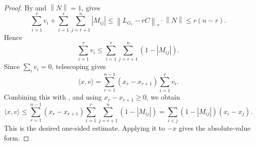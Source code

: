 \documentclass[10pt,reqno]{amsart}
\theoremstyle{definition}
\theoremstyle{remark}
\numberwithin{equation}{section}
\newcommand{\norm}[1]{\left\| #1 \right\|}
\begin{document}
\begin{proof}
    By  and $\norm{N}=1$,  gives
    \[
    \sum\limits_{i=1}^{r}v_i+\sum\limits_{i=1}^{r}\sum\limits_{j=r+1}^{n} |M_{ij}|
    \le \norm{L_{G_r}-rC}_* \cdot \norm{N}\le r(n-r).
    \]
    Hence
    \begin{equation}\label{eq:prefixineq}
        \sum\limits_{i=1}^{r}v_i\le
        \sum\limits_{i=1}^{r}\sum\limits_{j=r+1}^{n}(1-|M_{ij}|).
    \end{equation}
    Since $\sum_i v_i=0$, telescoping gives
    \[
        \langle x,v\rangle
        =
        \sum\limits_{r=1}^{n-1}(x_r-x_{r+1})\sum\limits_{i=1}^{r}v_i.
    \]
    Combining this with , and using $x_r-x_{r+1}\ge 0$, we obtain
    \[
        \langle x,v\rangle
        \le
        \sum\limits_{r=1}^{n-1}(x_r-x_{r+1})
        \sum\limits_{i=1}^{r}\sum\limits_{j=r+1}^{n}(1-|M_{ij}|)
        =
        \sum\limits_{i<j}(1-|M_{ij}|)(x_i-x_j).
    \]
    This is the desired one-sided estimate. Applying it to $-x$ gives the absolute-value form.
\end{proof}
\end{document}
